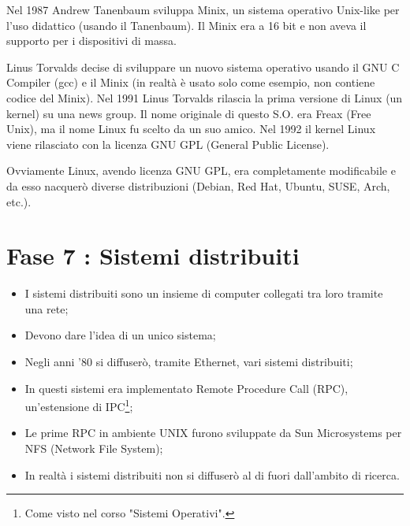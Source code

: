 Nel 1987 Andrew Tanenbaum sviluppa Minix, un sistema operativo Unix-like per 
l'uso didattico (usando il Tanenbaum). Il Minix era a 16 bit e non aveva il supporto   
per i dispositivi di massa. 

Linus Torvalds decise di sviluppare un nuovo sistema operativo usando il
GNU C Compiler (gcc) e il Minix (in realtà è usato solo come esempio, non contiene codice del Minix). Nel 1991 Linus Torvalds rilascia la prima
versione di Linux (un kernel) su una news group. Il nome originale di questo S.O.
era Freax (Free Unix), ma il nome Linux fu scelto da un suo amico.
Nel 1992 il kernel Linux viene rilasciato con la licenza GNU GPL (General Public License).


Ovviamente Linux, avendo licenza GNU GPL, era completamente modificabile e
da esso nacquerò diverse distribuzioni (Debian, Red Hat, Ubuntu, SUSE, Arch, etc.).

\section{Fase 7 : Sistemi distribuiti}

\begin{itemize}
    \item I sistemi distribuiti sono un insieme di computer collegati tra loro
    tramite una rete;
    \item Devono dare l'idea di un unico sistema;
    \item Negli anni '80 si diffuserò, tramite Ethernet, vari sistemi distribuiti;
    \item In questi sistemi era implementato Remote Procedure Call (RPC), un'estensione 
    di IPC\footnote{Come visto nel corso "Sistemi Operativi".};
    \item Le prime RPC in ambiente UNIX furono sviluppate da Sun Microsystems
    per NFS (Network File System);
    \item In realtà i sistemi distribuiti non si diffuserò al di fuori dall'ambito
    di ricerca.
\end{itemize}


